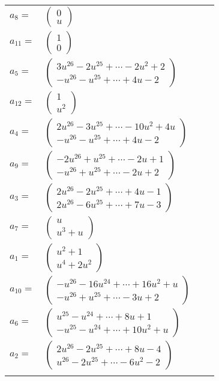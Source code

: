 \documentclass[1p]{elsarticle_modified}
\theoremstyle{definition}
\begin{document}
\begin{tabular}{m{7pt} m{180pt} m{7pt} m{180pt} }
\flushright $a_{8}=$&$\begin{pmatrix}0\\u\end{pmatrix}$ \\
\flushright $a_{11}=$&$\begin{pmatrix}1\\0\end{pmatrix}$ \\
\flushright $a_{5}=$&$\begin{pmatrix}3 u^{26}-2 u^{25}+\cdots-2 u^2+2\\- u^{26}- u^{25}+\cdots+4 u-2\end{pmatrix}$ \\
\flushright $a_{12}=$&$\begin{pmatrix}1\\u^2\end{pmatrix}$ \\
\flushright $a_{4}=$&$\begin{pmatrix}2 u^{26}-3 u^{25}+\cdots-10 u^2+4 u\\- u^{26}- u^{25}+\cdots+4 u-2\end{pmatrix}$ \\
\flushright $a_{9}=$&$\begin{pmatrix}-2 u^{26}+u^{25}+\cdots-2 u+1\\- u^{26}+u^{25}+\cdots-2 u+2\end{pmatrix}$ \\
\flushright $a_{3}=$&$\begin{pmatrix}2 u^{26}-2 u^{25}+\cdots+4 u-1\\2 u^{26}-6 u^{25}+\cdots+7 u-3\end{pmatrix}$ \\
\flushright $a_{7}=$&$\begin{pmatrix}u\\u^3+u\end{pmatrix}$ \\
\flushright $a_{1}=$&$\begin{pmatrix}u^2+1\\u^4+2 u^2\end{pmatrix}$ \\
\flushright $a_{10}=$&$\begin{pmatrix}- u^{26}-16 u^{24}+\cdots+16 u^2+u\\- u^{26}+u^{25}+\cdots-3 u+2\end{pmatrix}$ \\
\flushright $a_{6}=$&$\begin{pmatrix}u^{25}- u^{24}+\cdots+8 u+1\\- u^{25}- u^{24}+\cdots+10 u^2+u\end{pmatrix}$ \\
\flushright $a_{2}=$&$\begin{pmatrix}2 u^{26}-2 u^{25}+\cdots+8 u-4\\u^{26}-2 u^{25}+\cdots-6 u^2-2\end{pmatrix}$\\&\end{tabular}
\end{document}
